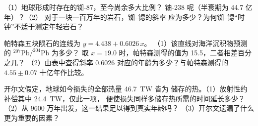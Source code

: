 \begin{exercise}[$\star\star\star$]\label{exo:g12:age-of-the-earth:13}
（1）地球形成时存在的铷-87，至今尚余多大比例？
铀-238 呢（半衰期为 44.7 亿年）？（2）
对于一块一百万年的岩石，铷–锶的斜率
应为多少？为何铷–锶“时钟”不适于测定年轻岩石？
\end{exercise}

\begin{exercise}[$\star\star\star$]\label{exo:g12:age-of-the-earth:14}
帕特森五块陨石的连线为 $y = 4.438 + 0.6026\,x$。
（1）该直线对海洋沉积物预测的 $^{207}\mathrm{Pb}/^{204}\mathrm{Pb}$ 为多少？
取 $x = 19.0$ 时，帕特森测得的值为 15.5，二者相差百分之几？
（2）由表中查得斜率 0.6026 对应的年龄为多少？与帕特森测得的
$4.55 \pm 0.07$ 十亿年作比较。
\end{exercise}

\begin{exercise}[$\star\star\star$]\label{exo:g12:age-of-the-earth:15}
开尔文假定，地球如今损失的全部热量 \qty{46.7}{TW} 皆为
储存的热。（1）放射性约补偿其中 \qty{24.4}{TW}，仅此一项，
便使损失同样多储存热所需的时间延长多少？
（2）从 9600 万年出发，这一结果足以得到真实年龄吗？
（3）开尔文遗漏了什么更为重要的因素？
\end{exercise}


